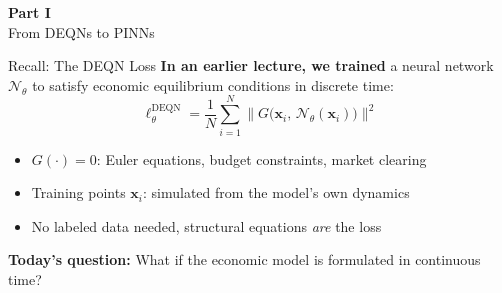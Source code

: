 \documentclass[aspectratio=169,11pt]{beamer}
\newcommand{\emphc}[1]{\textcolor{harvardcrimson}{#1}}
\newcommand{\x}{\bm{x}}
\begin{document}

\begin{frame}{}
\vfill
\begin{center}
{\Huge \textcolor{uzhblue}{\textbf{Part I}}}\\[12pt]
{\LARGE From DEQNs to PINNs}
\end{center}
\vfill
\end{frame}

\begin{frame}{Recall: The DEQN Loss}
\textbf{In an earlier lecture, we trained} a neural network $\mathcal{N}_\theta$ to satisfy
economic equilibrium conditions in \emphc{discrete time}:
\[
\boxed{
\ell_\theta^{\text{DEQN}} = \frac{1}{N}\sum_{i=1}^{N}
\bigl\|G\bigl(\x_i,\,\mathcal{N}_\theta(\x_i)\bigr)\bigr\|^2
}
\]

\vspace{0.3em}
\begin{itemize}
    \item $G(\cdot) = 0$: Euler equations, budget constraints, market clearing
    \item Training points $\x_i$: simulated from the model's own dynamics
    \item \emphc{No labeled data needed}, structural equations \emph{are} the loss
\end{itemize}

\vspace{0.5em}
\textbf{Today's question:}
What if the economic model is formulated in \emphc{continuous time}?
\end{frame}
\end{document}
